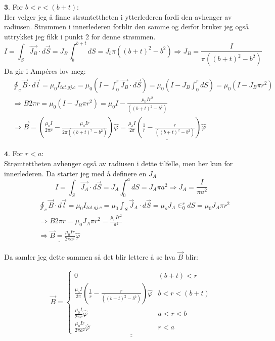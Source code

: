 \documentclass[a4paper,12pt,norsk]{article}
\begin{document}
$\textbf{3.}$ For $b<r<(b+t)$:\\
Her velger jeg å finne strømtettheten i ytterlederen fordi den avhenger av radiusen. Strømmen i innerlederen forblir den samme og derfor bruker jeg også uttrykket jeg fikk i punkt 2 for denne strømmen.
$$I = \int_S \vec{J_B} \cdot d\vec{S} = J_B\int _b^{b+t}dS = J_b\pi ((b+t)^2-b^2) \Rightarrow J_B = \frac{I}{\pi ((b+t)^2-b^2)}$$
Da gir i Ampéres lov meg:
\begin{align*}
&\oint_c \vec{B} \cdot d\vec{l} = \mu_0 I_{tot.gj.c} = \mu_0\left(I - \int_0^{r} \vec{J_B} \cdot d\vec{S}\right) =  \mu_0\left(I - J_B\int_0^{r} dS\right) =\mu_0(I - J_B\pi r^2) \\
&\Rightarrow B2\pi r =\mu_0(I - J_B\pi r^2) = \mu_0I - \frac{\mu_0 I r^2}{((b+t)^2-b^2)}\\
&\Rightarrow \vec{B} = \left(\frac{\mu_0I}{2\pi r} - \frac{\mu_0 I r}{2\pi ((b+t)^2-b^2)}\right)\hat{\varphi} = \underline{\frac{\mu_o I}{2\pi}\left( \frac{1}{r} - \frac{r}{((b+t)^2-b^2)}\right)\hat{\varphi}}
\end{align*}


$\textbf{4.}$ For $r<a$:\\
Strømtettheten avhenger også av radiusen i dette tilfelle, men her kun for innerlederen. Da starter jeg med å definere en $J_A$
$$ I = \int_S \vec{J_A} \cdot d\vec{S} = J_A \int_0^a dS = J_A\pi a^2 \Rightarrow J_A = \frac{I}{\pi a^2}$$
\begin{align*}
&\oint_c \vec{B} \cdot d\vec{l} = \mu_0 I_{tot.gj.c} = \mu_0\int_S \vec{J}_A \cdot d\vec{S} = \mu_oJ_A\in_0^r dS = \mu_0 J_A \pi r^2\\
&\Rightarrow B2\pi r = \mu_0 J_A \pi r^2 = \frac{\mu_0I r^2}{a^2}\\
&\underline{\Rightarrow \vec{B} = \frac{\mu_0 I r}{2\pi a^2}\hat{\varphi}}
\end{align*}

Da samler jeg dette sammen så det blir lettere å se hva $\vec{B}$ blir:

\begin{align*}
\underline{\underline{\vec{B} =
\begin{cases}
0 & (b+t)<r\\
\frac{\mu_o I}{2\pi}\left( \frac{1}{r} - \frac{r}{((b+t)^2-b^2)}\right)\hat{\varphi} & b<r<(b+t) \\
\frac{\mu_0 I}{2\pi r}\hat{\varphi} & a<r<b \\
\frac{\mu_0 I r}{2\pi a^2}\hat{\varphi} & r<a
\end{cases}}}
\end{align*}
\end{document}
